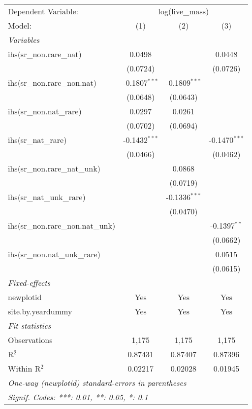 \begin{tabular}{lccc}
\tabularnewline\midrule\midrule
Dependent Variable:&\multicolumn{3}{c}{log(live\_mass)}\\
Model:&(1) & (2) & (3)\\
\midrule \emph{Variables}&   &   &  \\
ihs(sr\_non.rare\_nat)&0.0498 &    & 0.0448\\
  &(0.0724) &    & (0.0726)\\
ihs(sr\_non.rare\_non.nat)&-0.1807$^{***}$ & -0.1809$^{***}$ &   \\
  &(0.0648) & (0.0643) &   \\
ihs(sr\_non.nat\_rare)&0.0297 & 0.0261 &   \\
  &(0.0702) & (0.0694) &   \\
ihs(sr\_nat\_rare)&-0.1432$^{***}$ &    & -0.1470$^{***}$\\
  &(0.0466) &    & (0.0462)\\
ihs(sr\_non.rare\_nat\_unk)&   & 0.0868 &   \\
  &   & (0.0719) &   \\
ihs(sr\_nat\_unk\_rare)&   & -0.1336$^{***}$ &   \\
  &   & (0.0470) &   \\
ihs(sr\_non.rare\_non.nat\_unk)&   &    & -0.1397$^{**}$\\
  &   &    & (0.0662)\\
ihs(sr\_non.nat\_unk\_rare)&   &    & 0.0515\\
  &   &    & (0.0615)\\
\midrule \emph{Fixed-effects}&   &   &  \\
newplotid & Yes & Yes & Yes\\
site.by.yeardummy & Yes & Yes & Yes\\
\midrule \emph{Fit statistics}&  & & \\
Observations & 1,175&1,175&1,175\\
R$^2$ & 0.87431&0.87407&0.87396\\
Within R$^2$ & 0.02217&0.02028&0.01945\\
\midrule\midrule\multicolumn{4}{l}{\emph{One-way (newplotid) standard-errors in parentheses}}\\
\multicolumn{4}{l}{\emph{Signif. Codes: ***: 0.01, **: 0.05, *: 0.1}}\\
\end{tabular}


